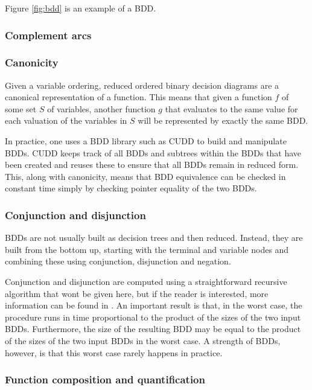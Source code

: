 Figure \ref{fig:bdd} is an example of a BDD.

\subsubsection{Complement arcs}

\subsubsection{Canonicity}
Given a variable ordering, reduced ordered binary decision diagrams are a canonical representation of a function. This means that given a function $f$ of some set $S$ of variables, another function $g$ that evaluates to the same value for each valuation of the variables in $S$ will be represented by exactly the same BDD.

In practice, one uses a BDD library such as CUDD \cite{cudd} to build and manipulate BDDs. CUDD keeps track of all BDDs and subtrees within the BDDs that have been created and reuses these to ensure that all BDDs remain in reduced form. This, along with canonicity, means that BDD equivalence can be checked in constant time simply by checking pointer equality of the two BDDs.

\subsubsection{Conjunction and disjunction}

BDDs are not usually built as decision trees and then reduced. Instead, they are built from the bottom up, starting with the terminal and variable nodes and combining these using conjunction, disjunction and negation.

Conjunction and disjunction are computed using a straightforward recursive algorithm that wont be given here, but if the reader is interested, more information can be found in \cite{somenzi_bdd}. An important result is that, in the worst case, the procedure runs in time proportional to the product of the sizes of the two input BDDs. Furthermore, the size of the resulting BDD may be equal to the product of the sizes of the two input BDDs in the worst case. A strength of BDDs, however, is that this worst case rarely happens in practice. 

\subsubsection{Function composition and quantification}

